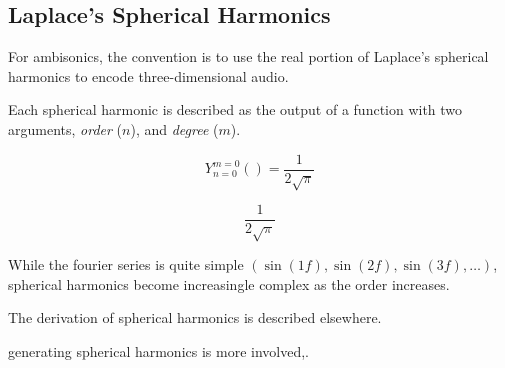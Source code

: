 \subsection{Laplace's Spherical Harmonics}

For ambisonics, the convention is to use the real portion of Laplace's
spherical harmonics to encode three-dimensional audio. 


Each spherical harmonic is described as the output of a
function with two arguments, \textit{order} ($n$), and
\textit{degree} ($m$).

\[
Y_{n=0}^{m=0}()=\frac{1}{2 \sqrt{\pi }}
\]

\[\frac{1}{2 \sqrt{\pi }} \]



While the fourier series is quite simple $(\sin(1f), \sin(2f),
\sin(3f), \ldots)$, spherical harmonics become increasingle complex as
the order increases. 

The derivation of spherical harmonics is described
elsewhere.\cite{Williams1999,Zotter2009a}


generating spherical harmonics is more involved,.



